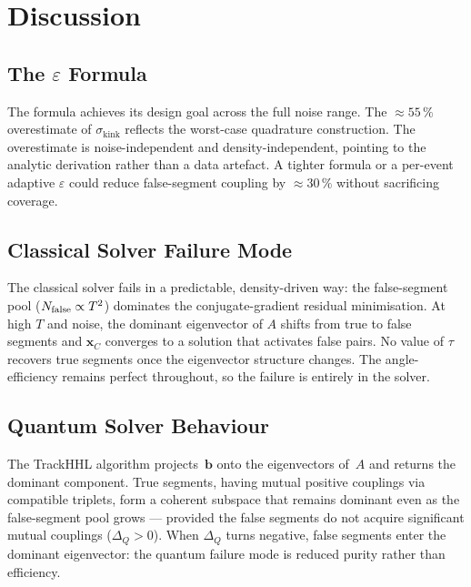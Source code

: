\documentclass[11pt,a4paper]{article}
\newcommand{\eps}{\varepsilon}
\newcommand{\srkink}{\sigma_{\mathrm{kink}}}
\newcommand{\ntrk}{T}
\begin{document}
\section{Discussion}
\label{sec:discussion}

\subsection{The $\varepsilon$ Formula}

The formula achieves its design goal across the full noise range.  The
$\approx\!55\,\%$ overestimate of $\srkink$ reflects the worst-case quadrature
construction.  The overestimate is noise-independent and density-independent, pointing
to the analytic derivation rather than a data artefact.  A tighter formula or a
per-event adaptive $\eps$ could reduce false-segment coupling by $\approx\!30\,\%$
without sacrificing coverage.

\subsection{Classical Solver Failure Mode}

The classical solver fails in a predictable, density-driven way: the false-segment
pool ($N_{\rm false}\propto\ntrk^2$) dominates the conjugate-gradient residual
minimisation.  At high $\ntrk$ and noise, the dominant eigenvector of $A$ shifts from
true to false segments and $\mathbf{x}_C$ converges to a solution that activates false
pairs.  No value of $\tau$ recovers true segments once the eigenvector structure
changes.  The angle-efficiency remains perfect throughout, so the failure is entirely
in the solver.

\subsection{Quantum Solver Behaviour}

The TrackHHL algorithm projects~$\mathbf{b}$ onto the eigenvectors of~$A$ and returns
the dominant component.  True segments, having mutual positive couplings via compatible
triplets, form a coherent subspace that remains dominant even as the false-segment pool
grows --- provided the false segments do not acquire significant mutual couplings
($\Delta_Q>0$).  When $\Delta_Q$ turns negative, false segments enter the dominant
eigenvector: the quantum failure mode is reduced purity rather than efficiency.
\end{document}
